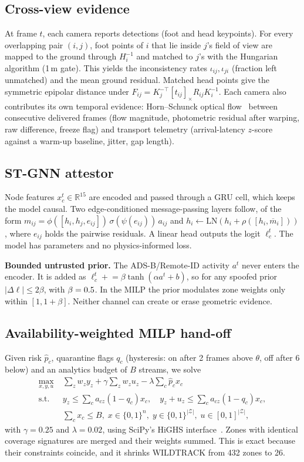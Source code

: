 \documentclass[journal]{IEEEtran}
\theoremstyle{remark}
\begin{document}
\subsection{Cross-view evidence}
At frame $t$, each camera reports detections (foot and head keypoints). For every overlapping pair $(i,j)$, foot points
of $i$ that lie inside $j$'s field of view are mapped to the ground through $H_i^{-1}$ and matched to $j$'s with the
Hungarian algorithm (1\,m gate). This yields the inconsistency rates $\iota_{ij},\iota_{ji}$ (fraction left unmatched)
and the mean ground residual. Matched head points give the symmetric epipolar distance under
$F_{ij}=K_j^{-\top}[t_{ij}]_\times R_{ij}K_i^{-1}$. Each camera also contributes its own temporal evidence:
Horn--Schunck optical flow~\cite{horn1981determining} between consecutive delivered frames (flow magnitude, photometric
residual after warping, raw difference, freeze flag) and transport telemetry (arrival-latency $z$-score against a
warm-up baseline, jitter, gap length).

\subsection{ST-GNN attestor}
Node features $x_c^t\in\mathbb{R}^{15}$ are encoded and passed through a GRU cell, which keeps the model causal. Two
edge-conditioned message-passing layers follow, of the form
$m_{ij}=\phi([h_i,h_j,e_{ij}])\,\sigma(\psi(e_{ij}))\,a_{ij}$ and $h_i\leftarrow\mathrm{LN}(h_i+\rho([h_i,\overline{m}_i]))$,
where $e_{ij}$ holds the pairwise residuals. A linear head outputs the logit $\ell_c^t$. The model has \GnnParams{}
parameters and no physics-informed loss.

\textbf{Bounded untrusted prior.} The ADS-B/Remote-ID activity $a^t$ never enters the encoder. It is added as
$\ell_c^t\mathrel{+}=\beta\tanh(\alpha a^t+b)$, so for any spoofed prior $|\Delta\ell|\le 2\beta$, with $\beta=0.5$.
In the MILP the prior modulates zone weights only within $[1,1+\beta]$. Neither channel can create or erase geometric
evidence.

\subsection{Availability-weighted MILP hand-off}
Given risk $\hat p_c$, quarantine flags $q_c$ (hysteresis: on after 2 frames above $\theta$, off after 6 below) and an
analytics budget of $B$ streams, we solve
\begin{align}
\max_{x,y,u}\;& \textstyle\sum_z w_z y_z+\gamma\sum_z w_z u_z-\lambda\sum_c \hat p_c x_c \nonumber\\
\text{s.t. }& y_z\le \textstyle\sum_c a_{cz}(1-q_c)x_c,\quad y_z+u_z\le \textstyle\sum_c a_{cz}(1-q_c)x_c,\nonumber\\
& \textstyle\sum_c x_c\le B,\; x\in\{0,1\}^n,\; y\in\{0,1\}^{|\mathcal Z|},\; u\in[0,1]^{|\mathcal Z|},\label{eq:milp}
\end{align}
with $\gamma=0.25$ and $\lambda=0.02$, using SciPy's HiGHS interface~\cite{huangfu2018highs}. Zones with identical
coverage signatures are merged and their weights summed. This is exact because their constraints coincide, and it
shrinks WILDTRACK from 432 zones to 26.
\end{document}
